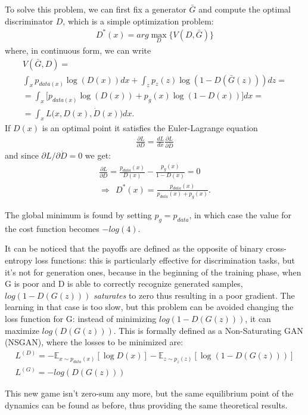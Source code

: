 To solve this problem, we can first fix a generator $\bar{G}$ and compute the optimal discriminator $D$, which is a simple optimization problem:
\begin{align*}
	D^*(x) = arg\max\limits_{D} \big\{V(D,\bar{G}) \big\}
\end{align*}
where, in continuous form, we can write
\begin{align*}
	V(\bar{G},D) =\\
	 \int_x p_{data(x)} \log(D(x)) dx + \int_z p_{z}(z) \log(1-D(\bar{G}(z))) dz =\\ 
	= \int_x \Big[p_{data(x)} \log(D(x)) + p_{g}(x) \log(1-D(x)) \Big]dx =\\
	= \int_x L\big(x,D(x),\dot{D}(x)\big)dx.
\end{align*}
If $D(x)$ is an optimal point it satisfies the Euler-Lagrange equation
\begin{align*}
	\frac{\partial L}{\partial D} = \frac{d L}{d x} \frac{\partial L}{\partial \dot{D}}
\end{align*}
and since $\partial L / \partial \dot{D} = 0$ we get:
\begin{align*}
\frac{\partial L}{\partial D} = \frac{p_{data}(x)}{D(x)} - \frac{p_g(x)}{1-D(x)} = 0 \\ 
\Rightarrow \ \ D^*(x) = \frac{p_{data}(x)}{p_{data}(x) + p_g(x)}.
\end{align*}

The global minimum is found by setting $p_g = p_{data}$, in which case the value for the cost function becomes $-log(4)$.

It can be noticed that the payoffs are defined as the opposite of binary cross-entropy loss functions: this is particularly effective for discrimination tasks, but it's not for generation ones, because in the beginning of the training phase, when G is poor and D is able to correctly recognize generated samples, $log(1-D(G(z)))$ \textit{saturates} to zero thus resulting in a poor gradient. The learning in that case is too slow, but this problem can be avoided changing the loss function for G: instead of minimizing $log(1-D(G(z)))$, it can maximize $log(D(G(z)))$. This is formally defined as a Non-Saturating GAN (NSGAN), where the losses to be minimized are:
\begin{align*}
L^{(D)} = -\mathbb{E}_{x \sim p_{data}(x)}[\log D(x)] - \mathbb{E}_{z \sim p_{z}(z)}[\log (1-D(G(z)))]\\
L^{(G)} = - log(D(G(z)))
\end{align*}

This new game isn't zero-sum any more, but the same equilibrium point of the dynamics can be found as before, thus providing the same theoretical results.
